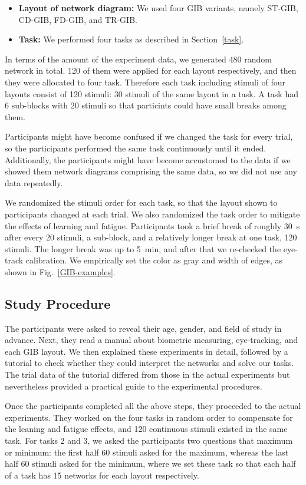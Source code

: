 \documentclass{vgtc}                          %
\begin{document}
\begin{itemize}
\item {\bf Layout of network diagram:} We used four GIB variants, namely ST-GIB, CD-GIB, FD-GIB, and TR-GIB.
\item {\bf Task:} We performed four tasks as described in Section~\ref{task}.
\end{itemize}

In terms of the amount of the experiment data, we generated 480 random network in total. 120 of them were applied for each layout respectively, and then they were allocated to four task. Therefore each task including stimuli of four layouts consist of 120 stimuli: 30 stimuli of the same layout in a task. A task had 6 sub-blocks with 20 stimuli so that particints could have small breaks among them.

Participants might have become confused if we changed the task for every trial, so the participants performed the same task continuously until it ended.
Additionally, the participants might have become accustomed to the data if we showed them network diagrams comprising the same data, so we did not use any data repeatedly.

We randomized the stimuli order for each task, so that the layout shown to participants changed at each trial.
We also randomized the task order to mitigate the effects of learning and fatigue.
Participants took a brief break of roughly 30~s after every 20 stimuli, a sub-block, and a relatively longer break at one task, 120 stimuli.
The longer break was up to 5~min, and after that we re-checked the eye-track calibration.
We empirically set the color as gray and width of edges, as shown in Fig.~\ref{GIB-examples}.

\subsection{Study Procedure}

The participants were asked to reveal their age, gender, and field of study in advance.
Next, they read a manual about biometric measuring, eye-tracking, and each GIB layout.
We then explained these experiments in detail, followed by a tutorial to check whether they could interpret the networks and solve our tasks.
The trial data of the tutorial differed from those in the actual experiments but nevertheless provided a practical guide to the experimental procedures.

Once the participants completed all the above steps, they proceeded to the actual experiments.
They worked on the four tasks in random order to compensate for the leaning and fatigue effects, and 120 continuous stimuli existed in the same task.
For tasks 2 and 3, we asked the participants two questions that maximum or minimum: the first half 60 stimuli asked for the maximum, whereas the last half 60 stimuli asked for the minimum, where we set these task so that each half of a task has 15 networks for each layout respectively.
\end{document}
